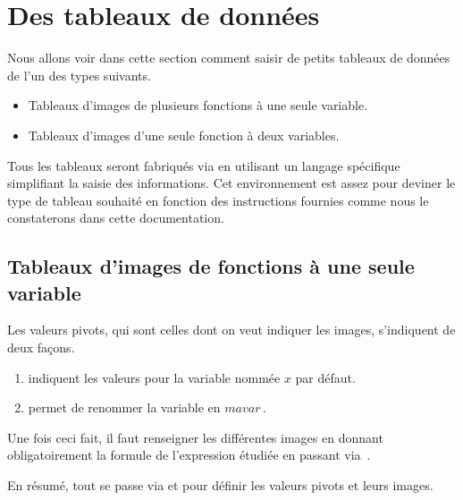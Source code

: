 \documentclass[10pt, a4paper]{article}
\begin{document}
\section{Des tableaux de données}

Nous allons voir dans cette section comment saisir de petits tableaux de données de l'un des types suivants.
\begin{itemize}
	\item Tableaux d'images de plusieurs fonctions à une seule variable.

	\item Tableaux d'images d'une seule fonction à deux variables.
\end{itemize}


\begin{tdocnote}
	Tous les tableaux seront fabriqués via  en utilisant un langage spécifique simplifiant la saisie des informations.
	Cet environnement est assez  pour deviner le type de tableau souhaité en fonction des instructions fournies comme nous le constaterons dans cette documentation.
\end{tdocnote}





\subsection{Tableaux d'images de fonctions à une seule variable}

Les valeurs pivots, qui sont celles dont on veut indiquer les images, s'indiquent de deux façons.
%
\begin{enumerate}
	\item {} indiquent les valeurs pour la variable nommée $x$ par défaut.

	\item {} permet de renommer la variable en $mavar$\,.
\end{enumerate}


Une fois ceci fait, il faut renseigner les différentes images en donnant obligatoirement la formule de l'expression étudiée en passant via \,.

\medskip

En résumé, tout se passe via  et  pour définir les valeurs pivots et leurs images.
\end{document}
